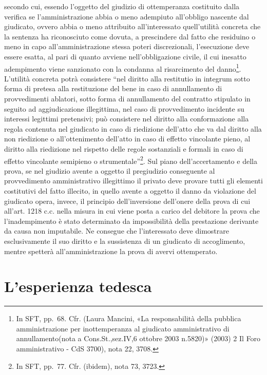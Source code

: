 \documentclass[12pt,it,a4paper,]{report}
\begin{document}
secondo cui, essendo l'oggetto del giudizio di ottemperanza costituito
dalla verifica se l'amministrazione abbia o meno adempiuto all'obbligo
nascente dal giudicato, ovvero abbia o meno attribuito all'interessato
quell'utilità concreta che la sentenza ha riconosciuto come dovuta, a
prescindere dal fatto che residuino o meno in capo all'amministrazione
stessa poteri discrezionali, l'esecuzione deve essere esatta, al pari di
quanto avviene nell'obbligazione civile, il cui inesatto adempimento
viene sanzionato con la condanna al risarcimento del danno\footnote{In
  SFT, pp.~68. Cfr. (Laura Mancini, {«La responsabilità della pubblica
  amministrazione per inottemperanza al giudicato amministrativo di
  annullamento(nota a Cons.St.,sez.IV,6 ottobre 2003 n.5820)»} (2003) 2
  Il Foro amministrativo - CdS 3700), nota 22, 3708.}. L'utilità
concreta potrà consistere ``nel diritto alla restitutio in integrum
sotto forma di pretesa alla restituzione del bene in caso di
annullamento di provvedimenti ablatori, sotto forma di annullamento del
contratto stipulato in seguito ad aggiudicazione illegittima, nel caso
di provvedimento incidente su interessi legittimi pretensivi; può
consistere nel diritto alla conformazione alla regola contenuta nel
giudicato in caso di riedizione dell'atto che va dal diritto alla non
riedizione o all'ottenimento dell'atto in caso di effetto vincolante
pieno, al diritto alla riedizione nel rispetto delle regole sostanziali
e formali in caso di effetto vincolante semipieno o
strumentale''\footnote{In SFT, pp.~77. Cfr. (ibidem), nota 73, 3723.}.
Sul piano dell'accertamento e della prova, se nel giudizio avente a
oggetto il pregiudizio conseguente al provvedimento amministrativo
illegittimo il privato deve provare tutti gli elementi costitutivi del
fatto illecito, in quello avente a oggetto il danno da violazione del
giudicato opera, invece, il principio dell'inversione dell'onere della
prova di cui all'art. 1218 c.c. nella misura in cui viene posta a carico
del debitore la prova che l'inadempimento è stato determinato da
impossibilità della prestazione derivante da causa non imputabile. Ne
consegue che l'interessato deve dimostrare esclusivamente il suo diritto
e la sussistenza di un giudicato di accoglimento, mentre spetterà
all'amministrazione la prova di avervi ottemperato.

\hypertarget{lesperienza-tedesca}{%
\chapter{L'esperienza tedesca}\label{lesperienza-tedesca}}
\end{document}
